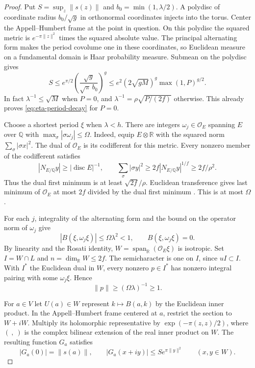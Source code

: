 \begin{proof}
Put \(S=\sup_z\|s(z)\|\) and \(b_0=\min(1,\lambda/2)\).
A polydisc of coordinate radius \(b_0/\sqrt g\) in orthonormal
coordinates injects into the torus. Center the Appell--Humbert
frame at the point in question. On this polydisc the squared
metric is \(e^{-\pi\|z\|^2}\) times the squared absolute value.
The principal alternating form makes the period covolume one in
these coordinates, so Euclidean measure on a fundamental domain
is Haar probability measure. Submean on the polydisc gives
\[
 S\le e^{\pi/2}\left(\frac{\sqrt g}{\sqrt\pi\,b_0}\right)^g
 \le e^2 (2\sqrt{gM})^g\max(1,P)^{g/2}.
\]
In fact \(\lambda^{-1}\le\sqrt M\) when \(P=0\), and
\(\lambda^{-1}=\rho\sqrt{P/(2f)}\) otherwise. This already proves
\eqref{eq:eta-period-decay} for \(P=0\).

Choose a shortest period \(\xi\) when \(\lambda<h\). There are
integers \(\omega_j\in\mathcal O_E\) spanning \(E\) over
\(\mathbb Q\) with \(\max_\sigma|\sigma\omega_j|\le\Omega\).
Indeed, equip \(E\otimes\mathbb R\) with the squared norm
\(\sum_\sigma|\sigma x|^2\). The dual of \(\mathcal O_E\)
is its codifferent for this metric. Every nonzero member of the
codifferent satisfies
\[
 |N_{E/\mathbb Q}y|\ge |\operatorname{disc}E|^{-1},
 \qquad \sum_\sigma|\sigma y|^2
       \ge 2f |N_{E/\mathbb Q}y|^{1/f}\ge 2f/\rho^2 .
\]
Thus the dual first minimum is at least \(\sqrt{2f}/\rho\).
Euclidean transference gives last minimum of \(\mathcal O_E\)
at most \(2f\) divided by the dual first minimum
\cite{banaszczyk}. This is at most \(\Omega\).

For each \(j\), integrality of the alternating form and the
bound on the operator norm of \(\omega_j\) give
\[
 |B(\xi,\omega_j\xi)|\le\Omega\lambda^2<1,
 \qquad B(\xi,\omega_j\xi)=0.
\]
By linearity and the Rosati identity, \(W=\operatorname{span}_{\mathbb R}
(\mathcal O_E\xi)\) is isotropic. Set \(I=W\cap L\) and
\(n=\dim_{\mathbb R}W\le2f\). The semicharacter is one on \(I\),
since \(uI\subset I\). With \(I^*\) the Euclidean dual in \(W\),
every nonzero \(p\in I^*\) has nonzero integral pairing with some
\(\omega_j\xi\). Hence
\[
 \|p\|\ge(\Omega\lambda)^{-1}\ge1.
\]

For \(a\in V\) let \(U(a)\in W\) represent
\(k\mapsto B(a,k)\) by the Euclidean inner product. In the
Appell--Humbert frame centered at \(a\), restrict the section to
\(W+iW\). Multiply its holomorphic representative by
\(\exp(-\pi(z,z)/2)\), where \((\ ,\ )\) is the complex bilinear
extension of the real inner product on \(W\).
The resulting function \(G_a\) satisfies
\[
 |G_a(0)|=\|s(a)\|,\qquad
 |G_a(x+iy)|\le S e^{\pi\|y\|^2}\qquad(x,y\in W).
\]


\end{proof}

